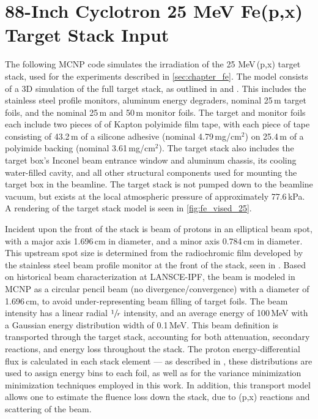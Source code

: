 % 



\section{88-Inch Cyclotron 25 MeV Fe(p,x) Target Stack Input} \label{sec:88_mcnp_deck_lowE}



The following MCNP code simulates the irradiation of the 25 MeV\,(p,x) target stack, used for the experiments described in  \autoref{sec:chapter_fe}.
The model consists of a 3D simulation of the full target stack, as outlined in  and  .
This includes the stainless steel profile monitors, aluminum energy degraders, nominal 25\,\mmicro m  target foils, and the nominal 25\,\mmicro m   and 50\,\mmicro m  monitor foils.
The target and monitor foils each include two pieces of of Kapton polyimide film tape, with each piece of  tape consisting of 43.2\,\mmicro m of a silicone adhesive (nominal 4.79\,mg/cm$^2$) on 25.4\,\mmicro m of a polyimide backing (nominal 3.61\,mg/cm$^2$).
The target stack also includes the target box's Inconel beam entrance window and aluminum chassis, its cooling water-filled cavity, and all other structural components used for mounting the target box in the beamline.
The target stack is not pumped down to the beamline vacuum, but exists at the local atmospheric pressure of approximately 77.6\,kPa.
A rendering of the target stack model  is seen in \autoref{fig:fe_vised_25}.




Incident upon the front of the stack is  beam of protons in an elliptical beam spot, with a major axis 1.696\,cm in diameter, and a minor axis 0.784\,cm in diameter.  
This upstream spot size is determined from the radiochromic film developed by the  stainless steel beam profile monitor at the front of the stack, seen in .
Based on historical beam characterization at LANSCE-IPF, the beam is modeled in MCNP as a circular pencil beam (no divergence/convergence) with a diameter of 1.696\,cm, to avoid under-representing beam filling of target foils.
The beam intensity has a linear radial $\sfrac{1}{r}$ intensity, and an average energy of 100\,MeV  with a Gaussian energy distribution width of 0.1\,MeV.
This beam definition is transported through the target stack, accounting for both attenuation, secondary reactions, and energy loss throughout the stack.
The proton energy-differential flux is calculated in each stack element --- as described in ,  these distributions are used to assign energy bins  to each foil, as well as for the variance minimization minimization techniques employed in this work.
In addition, this transport model allows one to estimate the fluence loss down the stack, due to (p,x) reactions and scattering of the beam.


% 
